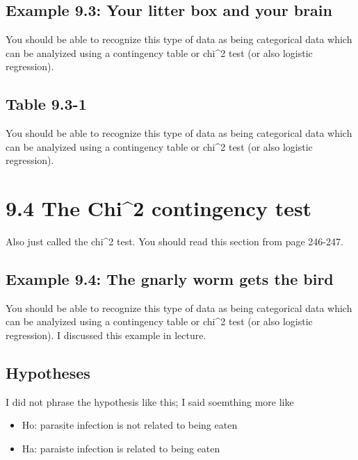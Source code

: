 \documentclass[]{book}
\providecommand{\tightlist}{%
  \setlength{\itemsep}{0pt}\setlength{\parskip}{0pt}}
\theoremstyle{definition}
\theoremstyle{definition}
\theoremstyle{definition}
\theoremstyle{remark}
\begin{document}
\subsection{Example 9.3: Your litter box and your
brain}\label{example-9.3-your-litter-box-and-your-brain}

You should be able to recognize this type of data as being categorical
data which can be analyized using a contingency table or chi\^{}2 test
(or also logistic regression).

\subsection{Table 9.3-1}\label{table-9.3-1}

You should be able to recognize this type of data as being categorical
data which can be analyized using a contingency table or chi\^{}2 test
(or also logistic regression).

\section{9.4 The Chi\^{}2 contingency
test}\label{the-chi2-contingency-test}

Also just called the chi\^{}2 test. You should read this section from
page 246-247.

\subsection{Example 9.4: The gnarly worm gets the
bird}\label{example-9.4-the-gnarly-worm-gets-the-bird}

You should be able to recognize this type of data as being categorical
data which can be analyized using a contingency table or chi\^{}2 test
(or also logistic regression). I discussed this example in lecture.

\subsection{Hypotheses}\label{hypotheses}

I did not phrase the hypothesis like this; I said soemthing more like

\begin{itemize}
\tightlist
\item
  Ho: parasite infection is not related to being eaten
\item
  Ha: paraiste infection is related to being eaten
\end{itemize}
\end{document}
